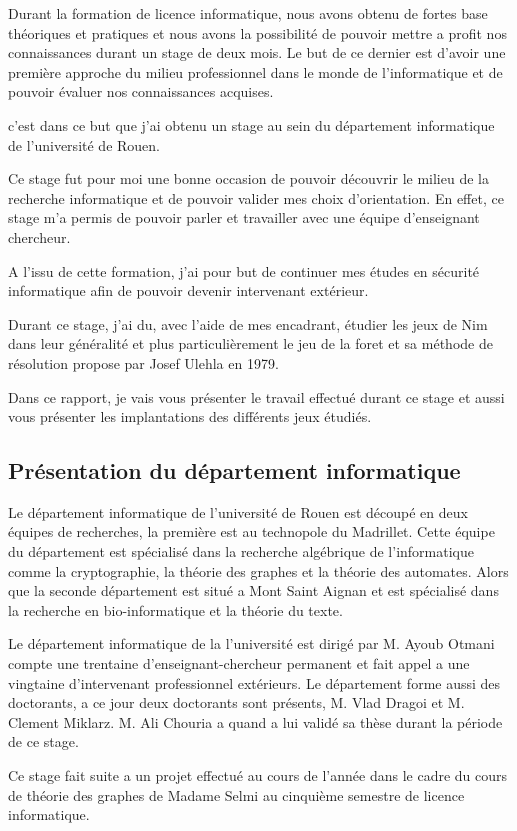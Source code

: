 Durant la formation de licence informatique, nous avons obtenu de fortes base théoriques et pratiques et nous avons la possibilité de pouvoir mettre a profit nos connaissances durant un stage de deux mois. Le but de ce dernier est d'avoir une première approche du milieu professionnel dans le monde de l'informatique et de pouvoir évaluer nos connaissances acquises.

c'est dans ce but que j'ai obtenu un stage au sein du département informatique de l’université de Rouen.

Ce stage fut pour moi une bonne occasion de pouvoir découvrir le milieu de la recherche informatique et de pouvoir valider mes choix d'orientation. En effet, ce stage m'a permis de pouvoir parler et travailler avec une équipe d'enseignant chercheur.

A l'issu de cette formation, j'ai pour but de continuer mes études en sécurité informatique afin de pouvoir devenir intervenant extérieur.

Durant ce stage, j'ai du, avec l'aide de mes encadrant, étudier les jeux de Nim dans leur généralité et plus particulièrement le jeu de la foret et sa méthode de résolution propose par Josef Ulehla en 1979.

Dans ce rapport, je vais vous présenter le travail effectué durant ce stage et aussi vous présenter les implantations des différents jeux étudiés.

\subsection{Présentation du département informatique}
\label{sub: Présentation du département informatique}

Le département informatique de l’université de Rouen est découpé en deux équipes de recherches, la première est au technopole du Madrillet. Cette équipe du département est spécialisé dans la recherche algébrique de l'informatique comme la cryptographie, la théorie des graphes et la théorie des automates. Alors que la seconde département est situé a Mont Saint Aignan et est spécialisé dans la recherche en bio-informatique et la théorie du texte.

Le département informatique de la l’université est dirigé par M. Ayoub Otmani compte une trentaine d'enseignant-chercheur permanent et fait appel a une vingtaine d'intervenant professionnel extérieurs. Le département forme aussi des doctorants, a ce jour deux doctorants sont présents, M. Vlad Dragoi et M. Clement Miklarz. M. Ali Chouria a quand a lui validé sa thèse durant la période de ce stage.

Ce stage fait suite a un projet effectué au cours de l’année dans le cadre du cours de théorie des graphes de Madame Selmi au cinquième semestre de licence informatique.
